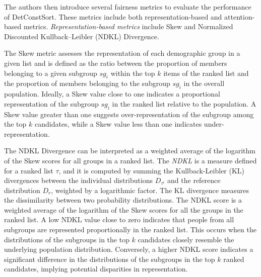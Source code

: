 The authors then introduce several fairness metrics to evaluate the performance of DetConstSort. These metrics include both representation-based and attention-based metrics. \emph{Representation-based metrics} include Skew and Normalized Discounted Kullback–Leibler (NDKL) Divergence.

The Skew metric assesses the representation of each demographic group in a given list
%
and is defined as the ratio between the proportion of members belonging to a given subgroup $sg_i$ within the top $k$ items of the ranked list 
and the proportion of members belonging to the subgroup $sg_i$ in the overall population.
Ideally, a Skew value close to one indicates a proportional representation of the subgroup $sg_i$ in the ranked list relative to the population. A Skew value greater than one suggests over-representation of the subgroup among the top $k$ candidates, while a Skew value less than one indicates under-representation.

 The NDKL Divergence
can be interpreted as a weighted average of the logarithm of the Skew scores for all groups in a ranked list.
%
The \emph{NDKL} is a measure defined for a ranked list $\tau$, and it is computed by summing the Kullback-Leibler (KL) divergences between the individual distributions $D_{\tau^i}$ and the reference distribution $D_r$, weighted by a logarithmic factor. The KL divergence measures the dissimilarity between two probability distributions. The NDKL score is a weighted average of the logarithm of the Skew scores for all the groups in the ranked list.
A low NDKL value close to zero indicates that people from all subgroups are represented proportionally in the ranked list. This occurs when the distributions of the subgroups in the top $k$ candidates closely resemble the underlying population distribution. Conversely, a higher NDKL score indicates a significant difference in the distributions of the subgroups in the top $k$ ranked candidates, implying potential disparities in representation.


